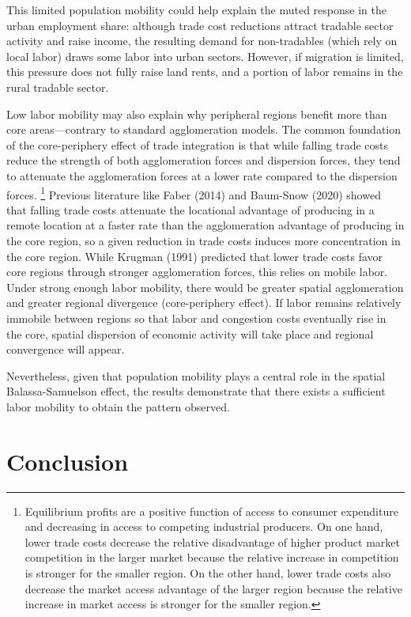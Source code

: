 \documentclass[11pt]{article}
\begin{document}
This limited population mobility could help explain the muted response in the urban employment share: although trade cost reductions attract tradable sector activity and raise income, the resulting demand for non-tradables (which rely on local labor) draws some labor into urban sectors. However, if migration is limited, this pressure does not fully raise land rents, and a portion of labor remains in the rural tradable sector.

Low labor mobility may also explain why peripheral regions benefit more than core areas—contrary to standard agglomeration models. The common foundation of the core-periphery effect of trade integration is that while falling trade costs reduce the strength of both agglomeration forces and dispersion forces, they tend to attenuate the agglomeration forces at a lower rate compared to the dispersion forces. \footnote{Equilibrium profits are a positive function of access to consumer expenditure and decreasing in access to competing industrial producers. On one hand, lower trade costs decrease the relative disadvantage of higher product market competition in the larger market because the relative increase in competition is stronger for the smaller region. On the other hand, lower trade costs also decrease the market access advantage of the larger region because the relative increase in market access is stronger for the smaller region.} Previous literature like Faber (2014) and Baum-Snow (2020) showed that falling trade costs attenuate the locational advantage of producing in a remote location at a faster rate than the agglomeration advantage of producing in the core region, so a given reduction in trade costs induces more concentration in the core region. While Krugman (1991) predicted that lower trade costs favor core regions through stronger agglomeration forces, this relies on mobile labor. Under strong enough labor mobility, there would be greater spatial agglomeration and greater regional divergence (core-periphery effect). If labor remains relatively immobile between regions so that labor and congestion costs eventually rise in the core, spatial dispersion of economic activity will take place and regional convergence will appear. 

Nevertheless, given that population mobility plays a central role in the spatial Balassa-Samuelson effect, the results demonstrate that there exists a sufficient labor mobility to obtain the pattern observed. 

\section{Conclusion}
\end{document}
